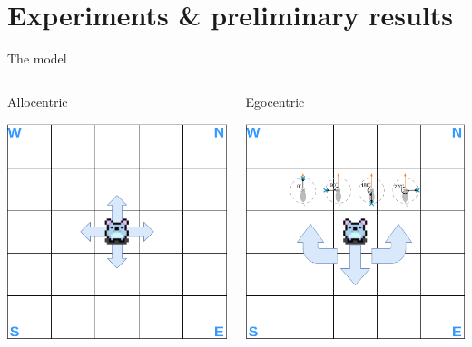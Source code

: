 \documentclass[bigger]{beamer}
\begin{document}
\section{Experiments \& preliminary results}
\label{sec:org475ebd5}
\begin{frame}[label={sec:org9c5eeba}]{The model}
\begin{columns}
\begin{column}{0.5\columnwidth}
\center
Allocentric
\begin{center}
\includegraphics[width=\textwidth]{img/RL_environment-Allo.drawio.png}
\end{center}
\end{column}
\begin{column}{0.5\columnwidth}
\center
Egocentric
\begin{center}
\includegraphics[width=\textwidth]{img/RL_environment-Ego.drawio.png}

\end{center}
\end{column}
\end{columns}
\end{frame}
\end{document}
